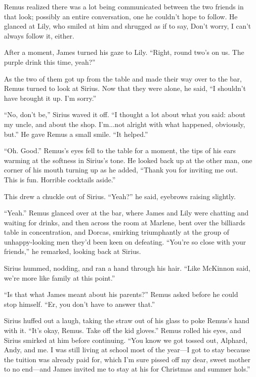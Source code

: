 Remus realized there was a lot being communicated between the two friends in that look; possibly an entire conversation, one he couldn’t hope to follow. He glanced at Lily, who smiled at him and shrugged as if to say, Don’t worry, I can’t always follow it, either.

After a moment, James turned his gaze to Lily. “Right, round two’s on us. The purple drink this time, yeah?”

As the two of them got up from the table and made their way over to the bar, Remus turned to look at Sirius. Now that they were alone, he said, “I shouldn’t have brought it up. I’m sorry.”

“No, don’t be,” Sirius waved it off. “I thought a lot about what you said: about my uncle, and about the shop. I’m...not alright with what happened, obviously, but.” He gave Remus a small smile. “It helped.”

“Oh. Good.” Remus’s eyes fell to the table for a moment, the tips of his ears warming at the softness in Sirius’s tone. He looked back up at the other man, one corner of his mouth turning up as he added, “Thank you for inviting me out. This is fun. Horrible cocktails aside.”

This drew a chuckle out of Sirius. “Yeah?” he said, eyebrows raising slightly.

“Yeah.” Remus glanced over at the bar, where James and Lily were chatting and waiting for drinks, and then across the room at Marlene, bent over the billiards table in concentration, and Dorcas, smirking triumphantly at the group of unhappy-looking men they’d been keen on defeating. “You’re so close with your friends,” he remarked, looking back at Sirius.

Sirius hummed, nodding, and ran a hand through his hair. “Like McKinnon said, we’re more like family at this point.”

“Is that what James meant about his parents?” Remus asked before he could stop himself. “Er, you don’t have to answer that.”

Sirius huffed out a laugh, taking the straw out of his glass to poke Remus’s hand with it. “It’s okay, Remus. Take off the kid gloves.” Remus rolled his eyes, and Sirius smirked at him before continuing. “You know we got tossed out, Alphard, Andy, and me. I was still living at school most of the year—I got to stay because the tuition was already paid for, which I’m sure pissed off my dear, sweet mother to no end—and James invited me to stay at his for Christmas and summer hols.”

